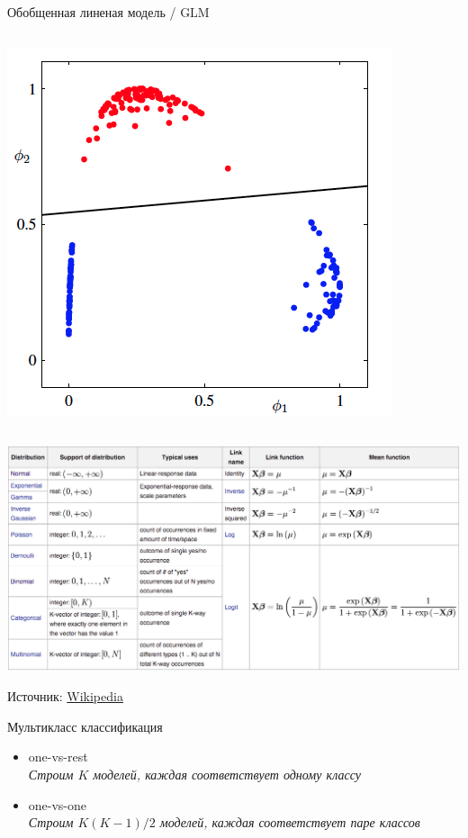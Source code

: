 \documentclass[aspectratio=169]{beamer}
\begin{document}
\begin{frame}{Обобщенная линеная модель / GLM}
\begin{columns}[T]
\begin{column}{.5\textwidth}
\begin{center}
   		\includegraphics[scale=0.25]{images/l.png}
    \end{center}
    \end{column}
  \end{columns}

\end{frame}

\begin{frame}

\begin{center}
\includegraphics[width=\textwidth]{images/glm.png}
\end{center}

Источник: \href{https://en.wikipedia.org/wiki/Generalized_linear_model}{Wikipedia}

\end{frame}

\begin{frame}{Мультикласс классификация}

\begin{itemize}
\item one-vs-rest \\
{\it Строим $K$ моделей, каждая соответствует одному классу}
\item one-vs-one \\
{\it Строим $K(K-1)/2$ моделей, каждая соответствует паре классов}
\end{itemize}

\end{frame}
\end{document}
